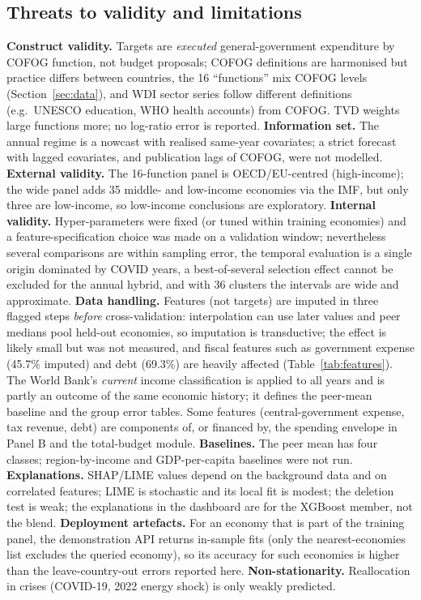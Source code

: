 \subsection{Threats to validity and limitations}
\textbf{Construct validity.} Targets are \emph{executed} general-government expenditure by COFOG function, not budget proposals; COFOG definitions are harmonised but practice differs between countries, the 16 ``functions'' mix COFOG levels (Section~\ref{sec:data}), and WDI sector series follow different definitions (e.g.\ UNESCO education, WHO health accounts) from COFOG. TVD weights large functions more; no log-ratio error is reported. \textbf{Information set.} The annual regime is a nowcast with realised same-year covariates; a strict forecast with lagged covariates, and publication lags of COFOG, were not modelled. \textbf{External validity.} The 16-function panel is OECD/EU-centred (high-income); the wide panel adds 35 middle- and low-income economies via the IMF, but only three are low-income, so low-income conclusions are exploratory. \textbf{Internal validity.} Hyper-parameters were fixed (or tuned within training economies) and a feature-specification choice was made on a validation window; nevertheless several comparisons are within sampling error, the temporal evaluation is a single origin dominated by COVID years, a best-of-several selection effect cannot be excluded for the annual hybrid, and with 36 clusters the intervals are wide and approximate. \textbf{Data handling.} Features (not targets) are imputed in three flagged steps \emph{before} cross-validation: interpolation can use later values and peer medians pool held-out economies, so imputation is transductive; the effect is likely small but was not measured, and fiscal features such as government expense (45.7\% imputed) and debt (69.3\%) are heavily affected (Table~\ref{tab:features}). The World Bank's \emph{current} income classification is applied to all years and is partly an outcome of the same economic history; it defines the peer-mean baseline and the group error tables. Some features (central-government expense, tax revenue, debt) are components of, or financed by, the spending envelope in Panel B and the total-budget module. \textbf{Baselines.} The peer mean has four classes; region-by-income and GDP-per-capita baselines were not run. \textbf{Explanations.} SHAP/LIME values depend on the background data and on correlated features; LIME is stochastic and its local fit is modest; the deletion test is weak; the explanations in the dashboard are for the XGBoost member, not the blend. \textbf{Deployment artefacts.} For an economy that is part of the training panel, the demonstration API returns in-sample fits (only the nearest-economies list excludes the queried economy), so its accuracy for such economies is higher than the leave-country-out errors reported here. \textbf{Non-stationarity.} Reallocation in crises (COVID-19, 2022 energy shock) is only weakly predicted.

